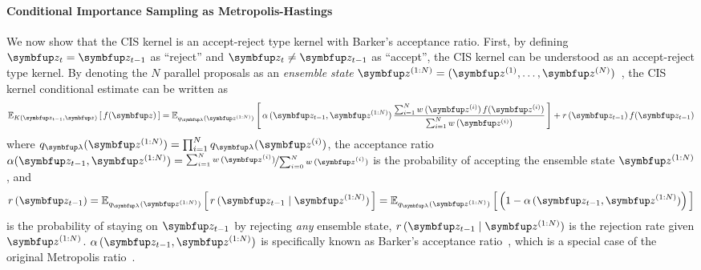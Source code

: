 \vspace{-0.1in}
\paragraph{Conditional Importance Sampling as Metropolis-Hastings}
We now show that the CIS kernel is an accept-reject type kernel with Barker's acceptance ratio.
First, by defining \(\vz_t = \vz_{t-1}\) as ``reject'' and \(\vz_t \neq \vz_{t-1}\) as ``accept'', the CIS kernel can be understood as an accept-reject type kernel.
By denoting the \(N\) parallel proposals as an \textit{ensemble state} \(\vz^{(1:N)} = (\vz^{(1)}, \ldots, \vz^{(N)})\)~\citep{neal_mcmc_2011a}, the CIS kernel conditional estimate can be written as
\begin{align}
  \Esub{K(\vz_{t-1}, \vz)}{f(\vz)}  = 
  \Esub{q_{\vlambda}(\vz^{(1:N)})}{
    \alpha\,(\vz_{t-1}, \vz^{(1:N)}) \,
    \frac{
      \sum^{N}_{i=1} w\,(\vz^{(i)})\,f(\vz^{(i)})
    }
    {
      \sum^{N}_{i=1} w\,(\vz^{(i)})
    }
  }
  + r\,(\vz_{t-1}) \, f(\vz_{t-1})\label{eq:cis_kernel}
\end{align}
where \(q_{\vlambda}(\vz^{(1:N)}) = \prod^N_{i=1} q_{\vlambda}(\vz^{(i)}) \),
the acceptance ratio
\(
  \alpha(\vz_{t-1}, \vz^{(1:N)})
  = \nicefrac{\sum^{N}_{i=1} w\,(\vz^{(i)})}{\sum^{N}_{i=0} w\,(\vz^{(i)})}
\)
is the probability of accepting the ensemble state \(\vz^{(1:N)}\), and
\begin{align}
  r\,(\vz_{t-1}) = \Esub{q_{\vlambda}(\vz^{(1:N)})}{
    r\,(\vz_{t-1} \mid \vz^{(1:N)})
  }
  = \Esub{q_{\vlambda}(\vz^{(1:N)})}{
    \left(1 - \alpha\,(\vz_{t-1}, \vz^{(1:N)})\right)
  }
\end{align}
is the probability of staying on \(\vz_{t-1}\) by rejecting \textit{any} ensemble state, \(r\,(\vz_{t-1}\mid \vz^{(1:N)})\) is the rejection rate given \(\vz^{(1:N)}\).
\(\alpha\,(\vz_{t-1}, \vz^{(1:N)})\) is specifically known as Barker's acceptance ratio~\citep{barker_monte_1965}, which is a special case of the original Metropolis ratio~\citep{metropolis_equation_1953}.

